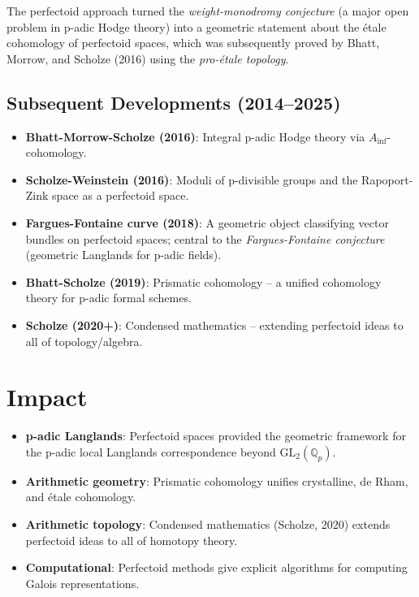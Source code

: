 \begin{highlightbox}
The perfectoid approach turned the \emph{weight-monodromy conjecture} (a major open problem in p-adic Hodge theory) into a geometric statement about the \'etale cohomology of perfectoid spaces, which was subsequently proved by Bhatt, Morrow, and Scholze (2016) using the \emph{pro-\'etale topology}.
\end{highlightbox}

\subsection{Subsequent Developments (2014--2025)}
\begin{itemize}
\item \textbf{Bhatt-Morrow-Scholze (2016)}: Integral p-adic Hodge theory via $A_{\text{inf}}$-cohomology.
\item \textbf{Scholze-Weinstein (2016)}: Moduli of p-divisible groups and the Rapoport-Zink space as a perfectoid space.
\item \textbf{Fargues-Fontaine curve (2018)}: A geometric object classifying vector bundles on perfectoid spaces; central to the \emph{Fargues-Fontaine conjecture} (geometric Langlands for p-adic fields).
\item \textbf{Bhatt-Scholze (2019)}: Prismatic cohomology -- a unified cohomology theory for p-adic formal schemes.
\item \textbf{Scholze (2020+)}: Condensed mathematics -- extending perfectoid ideas to all of topology/algebra.
\end{itemize}

\section{Impact}
\begin{itemize}
\item \textbf{p-adic Langlands}: Perfectoid spaces provided the geometric framework for the p-adic local Langlands correspondence beyond $\text{GL}_2(\mathbb{Q}_p)$.
\item \textbf{Arithmetic geometry}: Prismatic cohomology unifies crystalline, de Rham, and \'etale cohomology.
\item \textbf{Arithmetic topology}: Condensed mathematics (Scholze, 2020) extends perfectoid ideas to all of homotopy theory.
\item \textbf{Computational}: Perfectoid methods give explicit algorithms for computing Galois representations.
\end{itemize}


